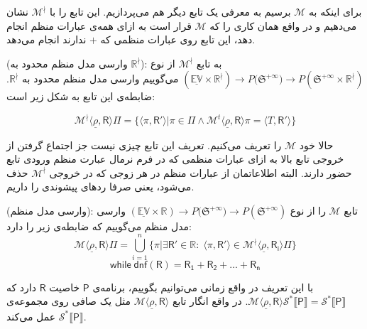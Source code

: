 برای اینکه به $\mathcal{M}$ برسیم به معرفی یک تابع دیگر هم می‌پردازیم. این تابع را با
 $\mathcal{M}^\nmid$ 
نشان می‌دهیم و در واقع همان کاری را که $\mathcal{M}$ قرار است به ازای همه‌ی عبارات منظم انجام دهد، این تابع روی عبارات منظمی که $+$ ندارند انجام می‌دهد.
\begin{defn}
	(وارسی مدل منظم محدود به $\mathbb{R^\nmid}$): به تابع $\mathcal{M}^\nmid$ از نوع \break
	$\mathbb{(\underline{EV} \times R^\nmid)} \rightarrow  \mathit{P}({\mathfrak{S}^{+\infty})}
	\rightarrow \mathit{P}(\mathfrak{S}^{+\infty} \times \mathbb{R}^\nmid ) $
	می‌گوییم وارسی مدل منظم محدود به $\mathbb{R^\nmid}$. ضابطه‌ی این تابع به شکل زیر است:
	
	 $$\mathcal{M}^\nmid \langle \underline{\rho} , \mathsf{R} \rangle \Pi= \{ \langle \pi , \mathsf{R'} \rangle | \pi \in \Pi \land  
	  \mathcal{M}^t \langle \underline{\rho} , \mathsf{R} \rangle \pi =
	 \langle \mathit{T} , \mathsf{R'} \rangle \}$$
\end{defn}


حالا خود $\mathcal{M}$ را تعریف می‌کنیم. تعریف این تابع چیزی نیست جز اجتماع گرفتن از خروجی تابع بالا به ازای عبارات منظمی که در فرم نرمال عبارت منظم ورودی تابع حضور دارند. البته اطلاعاتمان از عبارات منظم در هر زوجی که در خروجی $\mathcal{M}^\nmid$ حذف می‌شود، یعنی صرفا ردهای پیشوندی را داریم.

\begin{defn}
(وارسی مدل منظم):
تابع $\mathcal{M}$ را از نوع 
$\mathbb{(\underline{EV} \times R)} \rightarrow  \mathit{P}({\mathfrak{S}^{+\infty})}
\rightarrow \mathit{P}(\mathfrak{S}^{+\infty} ) $
 وارسی مدل منظم می‌گوییم که ضابطه‌ی زیر را دارد:
$$\mathcal{M} \langle \underline{\rho} , \mathsf{R} \rangle \Pi= \bigcup_{i=1}^n \{  \pi | \exists \mathsf{R'} \in \mathbb{R}:\; \langle \pi , \mathsf{R'} \rangle \in 
\mathcal{M}^\nmid \langle \underline{\rho}, \mathsf{R_i} \rangle \Pi \}$$
$$\mathsf{while \; dnf (R) = R_1 + R_2 + ... + R_n}$$ 





\end{defn}

با این تعریف در واقع زمانی می‌توانیم بگوییم، برنامه‌ی $\mathsf{P}$ خاصیت $\mathsf{R}$ دارد \break که 
$\mathcal{M}\langle \underline{\rho} , \mathsf{R} \rangle \mathcal{S}^* \llbracket \mathsf{P} \rrbracket = 
\mathcal{S}^* \llbracket \mathsf{P} \rrbracket$.
در واقع انگار تابع 
$\mathcal{M} \langle \underline{\rho} , \mathsf{R} \rangle$
مثل یک صافی روی مجموعه‌ی 
$\mathcal{S}^* \llbracket \mathsf{P} \rrbracket$
عمل می‌کند.


